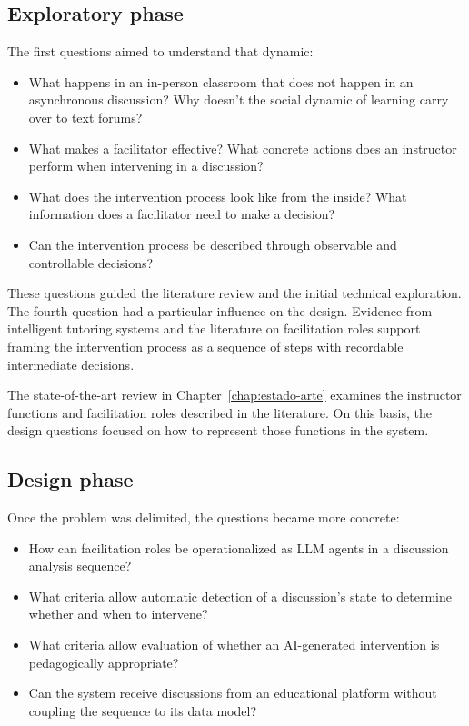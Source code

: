 \subsection{Exploratory phase}

The first questions aimed to understand that dynamic:

\begin{itemize}
  \item What happens in an in-person classroom that does not happen in an asynchronous discussion? Why doesn't the social dynamic of learning carry over to text forums?
  \item What makes a facilitator effective? What concrete actions does an instructor perform when intervening in a discussion?
  \item What does the intervention process look like from the inside? What information does a facilitator need to make a decision?
  \item Can the intervention process be described through observable and controllable decisions?
\end{itemize}

These questions guided the literature review and the initial technical exploration. The fourth question had a particular influence on the design. Evidence from intelligent tutoring systems \parencite{VanLehn2011} and the literature on facilitation roles \parencite{PilkingtonWalker2003} support framing the intervention process as a sequence of steps with recordable intermediate decisions.

The state-of-the-art review in Chapter~\ref{chap:estado-arte} examines the instructor functions and facilitation roles described in the literature. On this basis, the design questions focused on how to represent those functions in the system.

\subsection{Design phase}

Once the problem was delimited, the questions became more concrete:

\begin{itemize}
  \item How can facilitation roles be operationalized as LLM agents in a discussion analysis sequence?
  \item What criteria allow automatic detection of a discussion's state to determine whether and when to intervene?
  \item What criteria allow evaluation of whether an AI-generated intervention is pedagogically appropriate?
  \item Can the system receive discussions from an educational platform without coupling the sequence to its data model?
\end{itemize}

